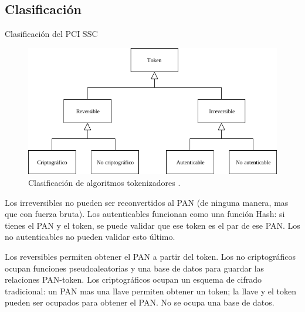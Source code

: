 %
%
%

\subsection{Clasificación}

\begin{frame}{Clasificación del PCI SSC}

  \begin{figure}[H]
    \begin{center}
      \includegraphics[width=1.0\linewidth]
        {../../../diagramas_comunes/clasificacion/clasificacion.png}
      \caption{Clasificación de algoritmos tokenizadores \cite{pci_tokens}.}
    \end{center}
  \end{figure}

  \note
  {
    Los irreversibles no pueden ser reconvertidos al PAN (de ninguna manera,
    mas que con fuerza bruta). Los autenticables funcionan como una función
    Hash: si tienes el PAN y el token, se puede validar que ese token es el
    par de ese PAN. Los no autenticables no pueden validar esto último.

    Los reversibles permiten obtener el PAN a partir del token. Los no
    criptográficos ocupan funciones pseudoaleatorias y una base de datos
    para guardar las relaciones PAN-token. Los criptográficos ocupan un
    esquema de cifrado tradicional: un PAN mas una llave permiten obtener
    un token; la llave y el token pueden ser ocupados para obtener el PAN. No
    se ocupa una base de datos.
  }

\end{frame}

